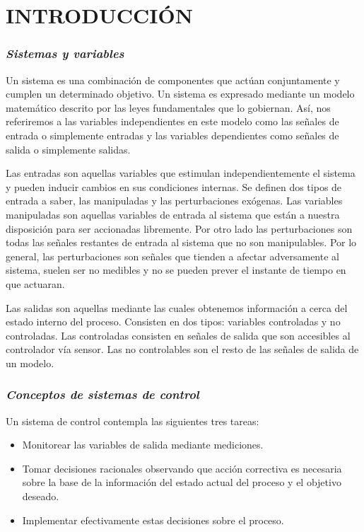 \section*{\large{INTRODUCCIÓN}}
\vspace{-0.25cm}
\justifying

\subsubsection*{\it{Sistemas y variables}}
\vspace{-0.25cm}
Un sistema es una combinación de componentes que actúan conjuntamente y cumplen un determinado objetivo.
Un sistema es expresado mediante un modelo matemático descrito por las leyes fundamentales que lo gobiernan. 
Así, nos referiremos a las variables independientes en este modelo como las señales de entrada o simplemente entradas 
y las variables dependientes como señales de salida o simplemente salidas.

Las entradas son aquellas variables que estimulan independientemente el sistema y pueden inducir cambios en sus condiciones internas. Se definen dos 
tipos de entrada a saber, las manipuladas y las perturbaciones exógenas. Las variables manipuladas son aquellas variables de entrada al sistema que están
a nuestra disposición para ser accionadas libremente. Por otro lado las perturbaciones son todas las señales restantes de entrada al sistema que no son 
manipulables. Por lo general, las perturbaciones son señales que tienden a afectar adversamente al sistema, suelen ser no medibles y no se pueden prever 
el instante de tiempo en que actuaran.

Las salidas son aquellas mediante las cuales obtenemos información a cerca del estado interno del proceso. Consisten en dos tipos: variables controladas 
y no controladas. Las controladas consisten en señales de salida que son accesibles al controlador vía sensor. Las no controlables son el resto de las señales 
de salida de un modelo. \parencite{ADAM}

\subsubsection*{\it{Conceptos de sistemas de control}}
\vspace{-0.25cm}

Un sistema de control contempla las siguientes tres tareas:
\begin{itemize}[noitemsep]
    \item Monitorear las variables de salida mediante mediciones.
    \item Tomar decisiones racionales observando que acción correctiva es necesaria sobre la base de la información del estado actual del proceso y el objetivo deseado.
    \item Implementar efectivamente estas decisiones sobre el proceso.
\end{itemize}

